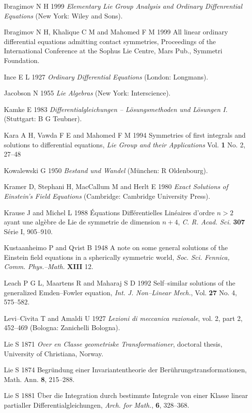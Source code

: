 Ibragimov N H 1999 {\em Elementary Lie Group Analysis
and Ordinary Diffenrential Equations} (New York: Wiley and Sons).

Ibragimov N H, Khalique C M and Mahomed F M 1999
All linear ordinary differential equations admitting  contact symmetries,
Proceedings of the International Conference at the Sophus Lie Centre, Mars
Pub., Symmetri Foundation.

Ince E L 1927 {\em Ordinary Differential Equations} (London: Longmans).

Jacobson N 1955 {\em Lie Algebras} (New York: Interscience).

Kamke E 1983 {\em Differentialgleichungen -- L\"osungsmethoden
und L\"osungen I.} (Stuttgart: B G Teubner).

Kara A H, Vawda F E and Mahomed F M  1994  Symmetries of first integrals and
solutions to differential equations, {\em Lie Group and their Applications}
Vol. {\bf 1} No. 2, 27--48

Kowalewski G 1950 {\em Bestand und Wandel} (M\"unchen: R Oldenbourg).

Kramer D, Stephani H, MacCallum M and Herlt E 1980 {\em Exact Solutions of
Einstein's Field Equations} (Cambridge: Cambridge University Press).

Krause J and Michel L 1988 \'Equations Diff\'erentielles
Lin\'eaires d'ordre $n>2$ ayant une alg\`ebre de Lie de symmetrie
de dimension $n+4$, {\em C. R. Acad. Sci.} {\bf 307} S\'erie I,
905--910.

Kustaanheimo P and Qvist B 1948  A note on some general solutions of the
Einstein field equations in a spherically symmetric world, {\em Soc. Sci.
Fennica, Comm. Phys.--Math.} {\bf XIII} 12.

Leach  P G L, Maartens R and Maharaj S D 1992 Self--similar solutions of the
generalized Emden--Fowler equation, {\em Int. J. Non--Linear Mech.}, Vol.
{\bf27} No. 4, 575--582. 

Levi--Civita T and Amaldi U 1927 {\em Lezioni di
meccanica razionale}, vol. 2, part 2, 452--469 (Bologna: Zanichelli Bologna). 

Lie S 1871 {\em Over en Classe geometriske
Transformationer}, doctoral thesis, University of Christiana, Norway.

Lie S 1874 Begr\"undung einer Invariantentheorie der
Ber\"uhrungstransformationen, Math. Ann. {\bf 8}, 215--288.

Lie S 1881  \"Uber die Integration durch bestimmte
Integrale von einer Klasse linear partialler Differentialgleichungen,
{\em Arch. for Math.}, {\bf 6}, 328--368.

